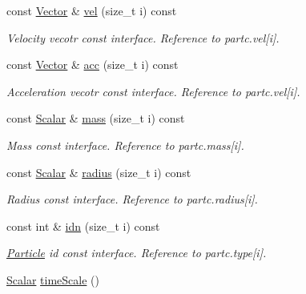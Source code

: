 \begin{DoxyCompactItemize}
const \mbox{\hyperlink{class_space_h_1_1_particle_system_a7cb2705f7e4edf94131c31eda3edfded}{Vector}} \& \mbox{\hyperlink{class_space_h_1_1_particle_system_a5f781e70a7b479b5b8ad427241203dae}{vel}} (size\+\_\+t i) const
\begin{DoxyCompactList}\small\item\em Velocity vecotr const interface. Reference to partc.\+vel\mbox{[}i\mbox{]}. \end{DoxyCompactList}\item 
const \mbox{\hyperlink{class_space_h_1_1_particle_system_a7cb2705f7e4edf94131c31eda3edfded}{Vector}} \& \mbox{\hyperlink{class_space_h_1_1_particle_system_a8cf5717cbb5b08d762fdfd6c6fd37d76}{acc}} (size\+\_\+t i) const
\begin{DoxyCompactList}\small\item\em Acceleration vecotr const interface. Reference to partc.\+vel\mbox{[}i\mbox{]}. \end{DoxyCompactList}\item 
const \mbox{\hyperlink{class_space_h_1_1_particle_system_a522770dcfaf8b29aed35ea9348185a34}{Scalar}} \& \mbox{\hyperlink{class_space_h_1_1_particle_system_a406f5aba5be8f379d0f1422997e9bf16}{mass}} (size\+\_\+t i) const
\begin{DoxyCompactList}\small\item\em Mass const interface. Reference to partc.\+mass\mbox{[}i\mbox{]}. \end{DoxyCompactList}\item 
const \mbox{\hyperlink{class_space_h_1_1_particle_system_a522770dcfaf8b29aed35ea9348185a34}{Scalar}} \& \mbox{\hyperlink{class_space_h_1_1_particle_system_a18070c0c4d554f65f67d3377e846010f}{radius}} (size\+\_\+t i) const
\begin{DoxyCompactList}\small\item\em Radius const interface. Reference to partc.\+radius\mbox{[}i\mbox{]}. \end{DoxyCompactList}\item 
const int \& \mbox{\hyperlink{class_space_h_1_1_particle_system_afbd15397e9717ae374f9ef6bab6a4d6b}{idn}} (size\+\_\+t i) const
\begin{DoxyCompactList}\small\item\em \mbox{\hyperlink{struct_space_h_1_1_particle}{Particle}} id const interface. Reference to partc.\+type\mbox{[}i\mbox{]}. \end{DoxyCompactList}\item 
\mbox{\hyperlink{class_space_h_1_1_particle_system_a522770dcfaf8b29aed35ea9348185a34}{Scalar}} \mbox{\hyperlink{class_space_h_1_1_particle_system_a48745701be46a42213d9b35c599bb10a}{time\+Scale}} ()

\end{DoxyCompactItemize}
